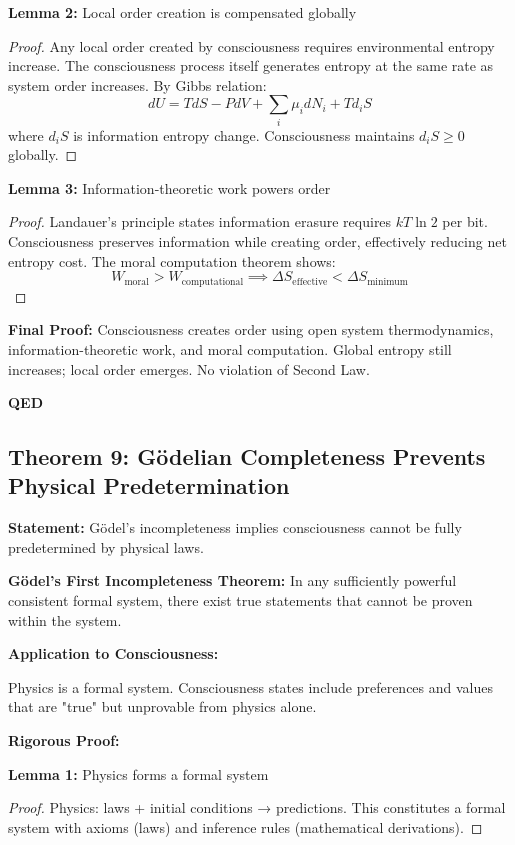 \documentclass[12pt,a4paper]{article}
\theoremstyle{definition}
\begin{document}
\textbf{Lemma 2:} Local order creation is compensated globally
\begin{proof}
Any local order created by consciousness requires environmental entropy increase. The consciousness process itself generates entropy at the same rate as system order increases. By Gibbs relation:
\begin{equation}
dU = T dS - P dV + \sum_i \mu_i dN_i + T d_i S
\end{equation}
where $d_i S$ is information entropy change. Consciousness maintains $d_i S \geq 0$ globally.
\end{proof}

\textbf{Lemma 3:} Information-theoretic work powers order
\begin{proof}
Landauer's principle states information erasure requires $kT \ln 2$ per bit. Consciousness preserves information while creating order, effectively reducing net entropy cost. The moral computation theorem shows:
\begin{equation}
W_{\text{moral}} > W_{\text{computational}} \implies \Delta S_{\text{effective}} < \Delta S_{\text{minimum}}
\end{equation}
\end{proof}

{\bf Final Proof:} Consciousness creates order using open system thermodynamics, information-theoretic work, and moral computation. Global entropy still increases; local order emerges. No violation of Second Law.

{\bf QED}

\subsection{Theorem 9: Gödelian Completeness Prevents Physical Predetermination}

{\bf Statement:} Gödel's incompleteness implies consciousness cannot be fully predetermined by physical laws.

{\bf Gödel's First Incompleteness Theorem:} In any sufficiently powerful consistent formal system, there exist true statements that cannot be proven within the system.

{\bf Application to Consciousness:}

Physics is a formal system. Consciousness states include preferences and values that are "true" but unprovable from physics alone.

{\bf Rigorous Proof:}

\textbf{Lemma 1:} Physics forms a formal system
\begin{proof}
Physics: laws + initial conditions → predictions. This constitutes a formal system with axioms (laws) and inference rules (mathematical derivations).
\end{proof}
\end{document}
